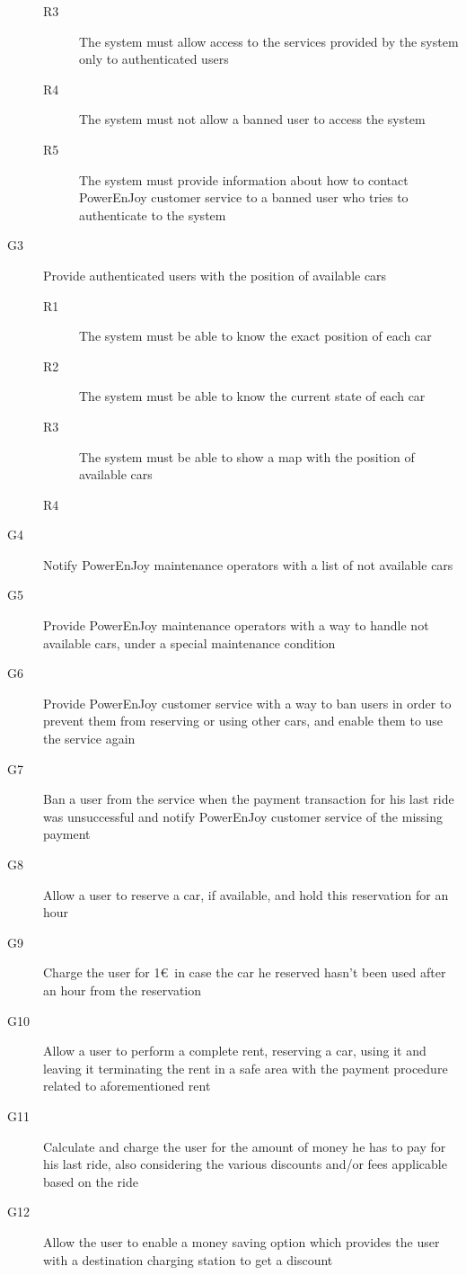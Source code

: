 \begin{description}
\begin{description}
			\item[R3] The system must allow access to the services provided by the system only to authenticated users 
			\item[R4] The system must not allow a banned user to access the system
			\item[R5] The system must provide information about how to contact PowerEnJoy customer service to a banned user who tries to authenticate to the system
		\end{description}
		\item[G3] Provide authenticated users with the position of available cars
		\begin{description}
			\item[R1] The system must be able to know the exact position of each car
			\item[R2] The system must be able to know the current state of each car
			\item[R3] The system must be able to show a map with the position of available cars
			\item[R4] 
		\end{description}
		\item[G4] Notify PowerEnJoy maintenance operators with a list of not available cars 
		\item[G5] Provide PowerEnJoy maintenance operators with a way to handle not available cars, under a special maintenance condition
		\item[G6] Provide PowerEnJoy customer service with a way to ban users in order to prevent them from reserving or using other cars, and enable them to use the service again
		\item[G7] Ban a user from the service when the payment transaction for his last ride was unsuccessful and notify PowerEnJoy customer service of the missing payment
		\item[G8] Allow a user to reserve a car, if available, and hold this reservation for an hour	
		\item[G9] Charge the user for 1\euro\ in case the car he reserved hasn't been used after an hour from the reservation
		\item[G10] Allow a user to perform a complete rent, reserving a car, using it and leaving it terminating the rent in a safe area with the payment procedure related to aforementioned rent
		\item[G11] Calculate and charge the user for the amount of money he has to pay for his last ride, also considering the various discounts and/or fees applicable based on the ride
		\item[G12] Allow the user to enable a money saving option which provides the user with a destination charging station to get a discount
	\end{description}

